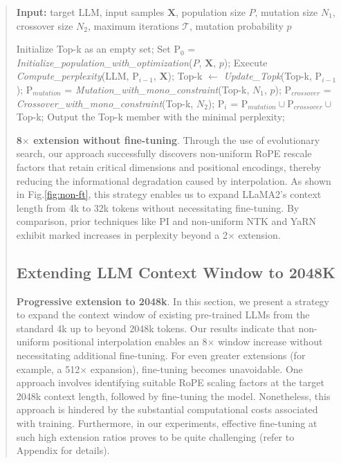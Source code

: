 \begin{abstract}
\begin{algorithm}[t]
	\small
	\caption{The search algorithm}
	\textbf{Input:} target LLM, input samples $\mathbf{X}$, population size $P$, mutation size $N_1$, crossover size $N_2$, maximum iterations $\mathcal{T}$, mutation probability $p$\\

	\begin{algorithmic}[1]
		\label{alg:search}
		\STATE Initialize Top-k as an empty set;
		\STATE Set $\text{P}_0$ = \textit{Initialize\_population\_with\_optimization}($P$, $\mathbf{X}$, $p$);
		\STATE Execute \textit{Compute\_perplexity}(LLM, $\text{P}_{i-1}$, $\mathbf{X}$);
		\STATE Top-k $\leftarrow$ \textit{Update\_Topk}(Top-k, $\text{P}_{i-1}$);
		\STATE $\text{P}_{mutation}$ = \textit{Mutation\_with\_mono\_constraint}(Top-k, $N_1$, $p$);
		\STATE $\text{P}_{crossover}$ = \textit{Crossover\_with\_mono\_constraint}(Top-k, $N_2$);
		\STATE $\text{P}_i$ = $\text{P}_{mutation} \cup \text{P}_{crossover} \cup$ Top-k;
		\ENDFOR
		\STATE Output the Top-k member with the minimal perplexity;
	\end{algorithmic}
\end{algorithm}

\textbf{8$\times$ extension without fine-tuning}. Through the use of evolutionary search, our approach successfully discovers non-uniform RoPE rescale factors that retain critical dimensions and positional encodings, thereby reducing the informational degradation caused by interpolation. As shown in Fig.\ref{fig:non-ft}, this strategy enables us to expand LLaMA2’s context length from 4k to 32k tokens without necessitating fine-tuning. By comparison, prior techniques like PI and non-uniform NTK and YaRN exhibit marked increases in perplexity beyond a 2$\times$ extension.

\subsection{Extending LLM Context Window to 2048K}
\label{sec:extendto2048k}

\textbf{Progressive extension to 2048k}. In this section, we present a strategy to expand the context window of existing pre-trained LLMs from the standard 4k up to beyond 2048k tokens. Our results indicate that non-uniform positional interpolation enables an 8$\times$ window increase without necessitating additional fine-tuning. For even greater extensions (for example, a 512$\times$ expansion), fine-tuning becomes unavoidable. One approach involves identifying suitable RoPE scaling factors at the target 2048k context length, followed by fine-tuning the model. Nonetheless, this approach is hindered by the substantial computational costs associated with training. Furthermore, in our experiments, effective fine-tuning at such high extension ratios proves to be quite challenging (refer to Appendix for details).


\end{abstract}
